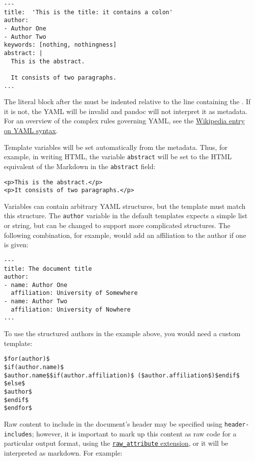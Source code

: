 \documentclass[
  a4paper,
]{article}
\begin{document}
\begin{verbatim}
---
title:  'This is the title: it contains a colon'
author:
- Author One
- Author Two
keywords: [nothing, nothingness]
abstract: |
  This is the abstract.

  It consists of two paragraphs.
...
\end{verbatim}

The literal block after the \texttt{\textbar{}} must be indented
relative to the line containing the \texttt{\textbar{}}. If it is not,
the YAML will be invalid and pandoc will not interpret it as metadata.
For an overview of the complex rules governing YAML, see the
\href{https://en.wikipedia.org/wiki/YAML\#Syntax}{Wikipedia entry on
YAML syntax}.

Template variables will be set automatically from the metadata. Thus,
for example, in writing HTML, the variable \texttt{abstract} will be set
to the HTML equivalent of the Markdown in the \texttt{abstract} field:

\begin{verbatim}
<p>This is the abstract.</p>
<p>It consists of two paragraphs.</p>
\end{verbatim}

Variables can contain arbitrary YAML structures, but the template must
match this structure. The \texttt{author} variable in the default
templates expects a simple list or string, but can be changed to support
more complicated structures. The following combination, for example,
would add an affiliation to the author if one is given:

\begin{verbatim}
---
title: The document title
author:
- name: Author One
  affiliation: University of Somewhere
- name: Author Two
  affiliation: University of Nowhere
...
\end{verbatim}

To use the structured authors in the example above, you would need a
custom template:

\begin{verbatim}
$for(author)$
$if(author.name)$
$author.name$$if(author.affiliation)$ ($author.affiliation$)$endif$
$else$
$author$
$endif$
$endfor$
\end{verbatim}

Raw content to include in the document's header may be specified using
\texttt{header-includes}; however, it is important to mark up this
content as raw code for a particular output format, using the
\protect\hyperlink{extension-raw_attribute}{\texttt{raw\_attribute}
extension}, or it will be interpreted as markdown. For example:
\end{document}
